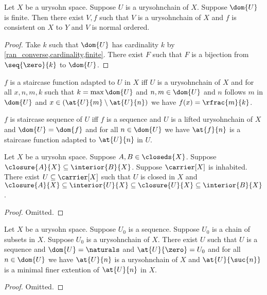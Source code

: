 \begin{proposition}\label{existence_normal_ordered_urysohn}
    Let $X$ be a urysohn space.
    Suppose $U$ is a urysohnchain of $X$.
    Suppose $\dom{U}$ is finite.
    Then there exist $V,f$ such that $V$ is a urysohnchain of $X$ and $f$ is consistent on $X$ to $Y$ and $V$ is normal ordered.
\end{proposition}
\begin{proof}
    Take $k$ such that $\dom{U}$ has cardinality $k$ by \cref{ran_converse,cardinality,finite}.
    There exist $F$ such that $F$ is a bijection from $\seq{\zero}{k}$ to $\dom{U}$.


\end{proof}


\begin{definition}\label{staircase}
    $f$ is a staircase function adapted to $U$ in $X$ iff $U$ is a urysohnchain of $X$ and for all $x,n,m,k$ such that $k = \max{\dom{U}}$ and $n,m \in \dom{U}$ and $n$ follows $m$ in $\dom{U}$ and $x \in (\at{U}{m} \setminus \at{U}{n})$ we have $f(x)= \rfrac{m}{k}$.
\end{definition}

\begin{definition}\label{staircase_sequence}
    $f$ is staircase sequence of $U$ iff $f$ is a sequence and $U$ is a lifted urysohnchain of $X$ and $\dom{U} = \dom{f}$ and for all $n \in \dom{U}$ we have $\at{f}{n}$ is a staircase function adapted to $\at{U}{n}$ in $U$.
\end{definition}





\begin{theorem}\label{urysohnsetinbeetween}
    Let $X$ be a urysohn space.
    Suppose $A,B \in \closeds{X}$.
    Suppose $\closure{A}{X} \subseteq \interior{B}{X}$.
    Suppose $\carrier[X]$ is inhabited.
    There exist $U \subseteq \carrier[X]$ such that $U$ is closed in $X$ and $\closure{A}{X} \subseteq \interior{U}{X} \subseteq \closure{U}{X} \subseteq \interior{B}{X}$.
\end{theorem}
\begin{proof}
    Omitted.
\end{proof}


\begin{theorem}\label{induction_on_urysohnchains}
    Let $X$ be a urysohn space.
    Suppose $U_0$ is a sequence.
    Suppose $U_0$ is a chain of subsets in $X$.
    Suppose $U_0$ is a urysohnchain of $X$.
    There exist $U$ such that $U$ is a sequence and $\dom{U} = \naturals$ and $\at{U}{\zero} = U_0$ and for all $n \in \dom{U}$ we have $\at{U}{n}$ is a urysohnchain of $X$ and $\at{U}{\suc{n}}$ is a minimal finer extention of $\at{U}{n}$ in $X$.
\end{theorem}
\begin{proof}
    Omitted.
\end{proof}





